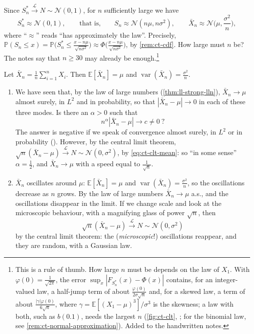 \begin{remark}\label{rem:ct-approximation}
Since $S_n^*\xrightarrow{\mathcal L}N\sim\mathcal N(0,1)$, for $n$ sufficiently large we have
\[
  S_n^*\approx\mathcal N(0,1),\qquad\text{that is,}\qquad S_n\approx\mathcal N(n\mu,n\sigma^2),
  \qquad\bar X_n\approx\mathcal N\Big(\mu,\frac{\sigma^2}n\Big),
\]
where ``$\approx$'' reads ``has approximately the law''. Precisely,
$\mathbb P(S_n\le x)=\mathbb P\big(S_n^*\le\frac{x-n\mu}{\sqrt{n\sigma^2}}\big)\approx
\Phi\big(\frac{x-n\mu}{\sqrt{n\sigma^2}}\big)$, by \cref{rem:ct-cdf}. How large must $n$ be? The
notes say that $n\ge30$ may already be enough.\footnote{This is a rule of thumb. How large $n$
must be depends on the law of $X_1$. With $\varphi(0)=\frac1{\sqrt{2\pi}}$, the error
$\sup_x|F_{S_n^*}(x)-\Phi(x)|$ contains, for an integer-valued law, a half-jump term of about
$\frac{\varphi(0)}{2\sigma\sqrt n}$ and, for a skewed law, a term of about
$\frac{|\gamma|\varphi(0)}{6\sqrt n}$, where $\gamma=\mathbb E[(X_1-\mu)^3]/\sigma^3$ is the skewness;
a law with both, such as $b(0.1)$, needs the largest $n$ (\cref{fig:ct-clt}, ;
for the binomial law, see \cref{rem:ct-normal-approximation}). Added to the handwritten notes.}
\end{remark}

\begin{remark}\label{rem:ct-fluctuations}
Let $\bar X_n=\frac1n\sum_{i=1}^nX_i$. Then $\mathbb E[\bar X_n]=\mu$ and
$\operatorname{var}(\bar X_n)=\frac{\sigma^2}n$.
\begin{enumerate}[label=\arabic*)]
  \item We have seen that, by the law of large numbers (\cref{thm:ll-strong-lln}),
    $\bar X_n\to\mu$ almost surely, in $L^2$ and in probability, so that
    $|\bar X_n-\mu|\to0$ in each of these three modes. Is there an $\alpha>0$ such that
    \[
      n^\alpha|\bar X_n-\mu|\longrightarrow c\neq0\ ?
    \]
    The answer is negative if we speak of convergence almost surely, in $L^2$ or in probability
    (). However, by the central limit theorem,
    $\sqrt n(\bar X_n-\mu)\xrightarrow{\mathcal L}N\sim\mathcal N(0,\sigma^2)$, by
    \eqref{eq:ct-clt-mean}: so ``in some sense'' $\alpha=\frac12$, and $\bar X_n\to\mu$ with a speed
    equal to $\frac1{\sqrt n}$.
  \item $\bar X_n$ oscillates around $\mu$: $\mathbb E[\bar X_n]=\mu$ and
    $\operatorname{var}(\bar X_n)=\frac{\sigma^2}n$, so the oscillations decrease as $n$ grows. By
    the law of large numbers $\bar X_n\to\mu$ a.s., and the oscillations disappear in the limit.
    If we change scale and look at the microscopic behaviour, with a magnifying glass of power
    $\sqrt n$, then
    \[
      \sqrt n(\bar X_n-\mu)\xrightarrow{\mathcal L}N\sim\mathcal N(0,\sigma^2)
    \]
    by the central limit theorem: the (\emph{microscopic}!) oscillations reappear, and they are
    random, with a Gaussian law.
\end{enumerate}
\end{remark}

